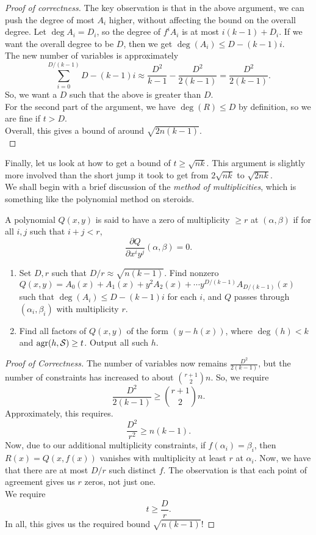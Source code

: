		\begin{proof}[Proof of correctness]
			The key observation is that in the above argument, we can push the degree of most $A_i$ higher, without affecting the bound on the overall degree. Let $\deg A_i = D_i$, so the degree of $f^i A_i$ is at most $i(k-1) + D_i$. If we want the overall degree to be $D$, then we get $\deg(A_i) \le D - (k-1)i$.\\
			The new number of variables is approximately
			\[ \sum_{i=0}^{D/(k-1)} D - (k-1)i \approx \frac{D^2}{k-1} - \frac{D^2}{2(k-1)} = \frac{D^2}{2(k-1)}. \]
			So, we want a $D$ such that the above is greater than $D$.\\
			For the second part of the argument, we have $\deg(R) \le D$ by definition, so we are fine if $t > D$.\\
			Overall, this gives a bound of around $\sqrt{2n(k-1)}$.\\
		\end{proof}

		Finally, let us look at how to get a bound of $t \ge \sqrt{nk}$. This argument is slightly more involved than the short jump it took to get from $2\sqrt{nk}$ to $\sqrt{2nk}$.\\
		We shall begin with a brief discussion of the \emph{method of multiplicities}, which is something like the polynomial method on steroids.

		\begin{fdef}
			A polynomial $Q(x,y)$ is said to have a zero of multiplicity $\ge r$ at $(\alpha,\beta)$ if for all $i,j$ such that $i+j<r$,
			\[ \frac{\partial Q}{\partial x^i y^j} (\alpha,\beta) = 0. \]
		\end{fdef}

		\begin{enumerate}
			\item Set $D,r$ such that $D/r \approx \sqrt{n(k-1)}$. Find nonzero $Q(x,y) = A_0(x) + A_1(x) + y^2 A_2(x) + \cdots y^{D/(k-1)} A_{D/(k-1)}(x)$ such that $\deg(A_i) \le D - (k-1)i$ for each $i$, and $Q$ passes through $(\alpha_i,\beta_i)$ with multiplicity $r$.
			\item Find all factors of $Q(x,y)$ of the form $(y - h(x))$, where $\deg(h) < k$ and $\operatorname{agr}(h,\mathcal{S}) \ge t$. Output all such $h$.
		\end{enumerate}
		
		\begin{proof}[Proof of Correctness]
			The number of variables now remains $\frac{D^2}{2(k-1)}$, but the number of constraints has increased to about $\binom{r+1}{2}n$. So, we require
			\[ \frac{D^2}{2(k-1)} \ge \binom{r+1}{2} n. \]
			Approximately, this requires.
			\[ \frac{D^2}{r^2} \ge n(k-1). \]
			Now, due to our additional multiplicity constraints, if $f(\alpha_i) = \beta_i$, then $R(x) = Q(x,f(x))$ vanishes with multiplicity at least $r$ at $\alpha_i$. %
			Now, we have that there are at most $D/r$ such distinct $f$. The observation is that each point of agreement gives us $r$ zeros, not just one.\\
			We require
			\[ t \ge \frac{D}{r}. \]
			In all, this gives us the required bound $\sqrt{n(k-1)}$!
		\end{proof}


